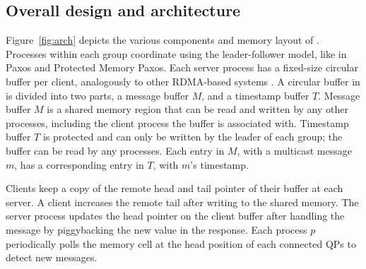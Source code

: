 \subsection{Overall design and architecture}
\label{sec:overview}

Figure~\ref{fig:arch} depicts the various components and memory layout of \libname.
Processes within each group coordinate using the leader-follower model, like in Paxos and Protected Memory Paxos.
Each server process has a fixed-size circular buffer per client, analogously to other RDMA-based systems \cite{FaRM, Mu, DARE, APUS}.
A circular buffer in \libname is divided into two parts, a message buffer $M$, and a timestamp buffer $T$.
Message buffer $M$ is a shared memory region that can be read and written by any other processes, including the client process the buffer is associated with.
Timestamp buffer $T$ is protected and can only be written by the leader of each group; the buffer can be read by any processes.
Each entry in $M$, with a multicast message $m$, has a corresponding entry in $T$, with $m$'s timestamp.


Clients keep a copy of the remote head and tail pointer of their buffer at each server. 
A client increases the remote tail after writing to the shared memory. 
The server process updates the head pointer on the client buffer after handling the message by piggybacking the new value in the response.
Each process $p$ periodically polls the memory cell at the head position of each
connected QPs to detect new messages.




